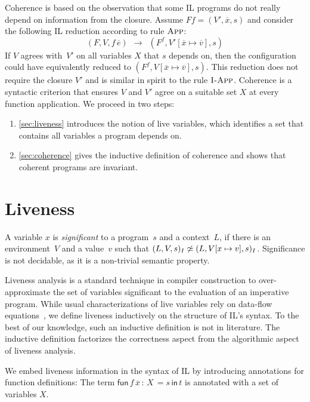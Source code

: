 \documentclass[openright,a4paper,11pt]{scrartcl}
\newcommand{\slist}[1]{\ensuremath{\overline{#1}}}
\newcommand{\update}[2]{\ensuremath{[#1\mapsto{}#2]}}
\newcommand{\nrule}[1]{\ensuremath{\textup{\textsc{#1}}}}
\newcommand{\ilIn}{\textsf{in}}
\newcommand{\ilGoto}[2]{#1\,#2}
\newcommand{\ilLetRecA}[5]{\textsf{fun}\,#1\,#2\,:\,#5\,=#3\,\ilIn\,#4}
\newcommand{\fevals}{\ensuremath{\longrightarrow}}
\newcommand{\fevalsg}[2]{\stackrel{#2}{\fevals}_{#1}}
\newcommand{\myref}[1]{\autoref{#1}}
\theoremstyle{plain}
\theoremstyle{plain}
\theoremstyle{plain}
\theoremstyle{plain}
\theoremstyle{nonumberplain}
\begin{document}
Coherence is based on the observation that some IL programs do not really depend on information from the closure.
Assume $F f = (V', \slist{x}, s)$ and consider the following IL reduction according to rule \nrule{App}:
$$    (F, V, \ilGoto{f}{\slist{e}})~~\fevalsg{}{}~~
             (F^f,V'\update{\slist{x}}{\slist{v}}, s)$$
If $V$ agrees with~$V'$ on all variables $X$ that $s$ depends on, then the configuration could have equivalently reduced to $(F^f,V\update{\slist{x}}{\slist{v}},s)$.
This reduction does not require the closure $V'$ and is similar in spirit to the rule \nrule{I-App}.
Coherence is a syntactic criterion that ensures $V$ and $V'$ agree on a suitable set $X$ at every function application.
We proceed in two steps:
\begin{enumerate}
\item \myref{sec:liveness} introduces the notion of live variables, which identifies a set that contains all variables a program depends on.
\item \myref{sec:coherence} gives the inductive definition of coherence and shows that coherent programs are invariant.
\end{enumerate}








 \section{Liveness}
\label{chap:liveness}
\label{sec:liveness}
A variable $x$ is \emph{significant} to a program~$s$ and a context~$L$,
if there is an environment~$V$ and a value~$v$ such that $(L,V,s)_I\not\simeq (L,V[x\mapsto v],s)_I$.
Significance is not decidable, as it is a non-trivial semantic property.

Liveness analysis is a standard technique in compiler construction to over-approximate the set of variables significant to the evaluation of an imperative program.
While usual characterizations of live variables rely on data-flow equations~\cite{Nipkow:2014},
we define liveness inductively on the structure of IL's syntax.
To the best of our knowledge, such an inductive definition is not in literature.
The inductive definition factorizes the correctness aspect from the algorithmic aspect of liveness analysis.

We embed liveness information in the syntax of IL by introducing annotations
for function definitions: The term $\ilLetRecA{f}{\slist{x}}{s}{t}{X}$ is annotated with a set of variables $X$.
\end{document}
